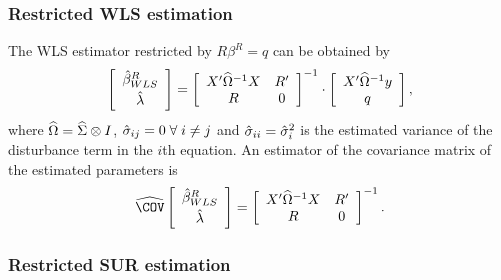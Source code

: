 \subsubsection{Restricted WLS estimation}

The WLS estimator restricted by $R \beta^R = q$ can be obtained by
\begin{equation}
   \left[ \begin{array}{c}
      \hat{\beta}^R_{WLS} \\[0.2em] \hat{\lambda}
   \end{array} \right]
   =
   \left[ \begin{array}{cc}
      X' \widehat{\Omega}^{-1} X & R' \\
      R & 0
   \end{array} \right]^{-1}
   \cdot
   \left[ \begin{array}{c}
      X' \widehat{\Omega}^{-1} y \\ q
   \end{array} \right] ,
\end{equation}
where $\widehat{\Omega} = \widehat{\Sigma} \otimes I$,
$\hat{\sigma}_{ij} = 0 \; \forall \; i \neq j$ and
$\hat{\sigma}_{ii} = \hat{\sigma}_i^2$ is the estimated variance
of the disturbance term in the $i$th equation.
An estimator of the covariance matrix of the estimated parameters is
\begin{equation}
   \COVHat
   \left[ \begin{array}{c}
      \bHat^R_{WLS} \\[0.2em] \lHat
   \end{array} \right] 
   = 
   \left[ \begin{array}{cc}
      X' \OHat^{-1} X & R' \\
      R & 0
   \end{array} \right]^{-1} .
\end{equation}

\subsubsection{Restricted SUR estimation}

